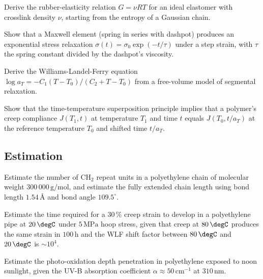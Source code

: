 \begin{exercise}
Derive the rubber-elasticity relation $G = \nu R T$ for an ideal
elastomer with crosslink density $\nu$, starting from the entropy of
a Gaussian chain.
\end{exercise}

\begin{exercise}
Show that a Maxwell element (spring in series with dashpot) produces
an exponential stress relaxation $\sigma(t) = \sigma_0 \exp(-t/\tau)$
under a step strain, with $\tau$ the spring constant divided by the
dashpot's viscosity.
\end{exercise}

\begin{exercise}
Derive the Williams-Landel-Ferry equation $\log a_T = -C_1(T - T_0)/
(C_2 + T - T_0)$ from a free-volume model of segmental relaxation.
\end{exercise}

\begin{exercise}
Show that the time-temperature superposition principle implies that
a polymer's creep compliance $J(T_1, t)$ at temperature $T_1$ and time
$t$ equals $J(T_0, t/a_T)$ at the reference temperature $T_0$ and
shifted time $t/a_T$.
\end{exercise}

\subsection*{Estimation}

\begin{exercise}
Estimate the number of CH$_2$ repeat units in a polyethylene chain of
molecular weight $300\,000\,\text{g}/\text{mol}$, and estimate the
fully extended chain length using bond length $1.54\,\si{\angstrom}$
and bond angle $109.5^{\circ}$.
\end{exercise}

\begin{exercise}
Estimate the time required for a $30\,\%$ creep strain to develop in
a polyethylene pipe at $20\,\degC$ under $5\,\text{MPa}$ hoop stress,
given that creep at $80\,\degC$ produces the same strain in
$100\,\text{h}$ and the WLF shift factor between $80\,\degC$ and
$20\,\degC$ is $\sim 10^4$.
\end{exercise}

\begin{exercise}
Estimate the photo-oxidation depth penetration in polyethylene
exposed to noon sunlight, given the UV-B absorption coefficient
$\alpha \approx 50\,\text{cm}^{-1}$ at $310\,\text{nm}$.
\end{exercise}

